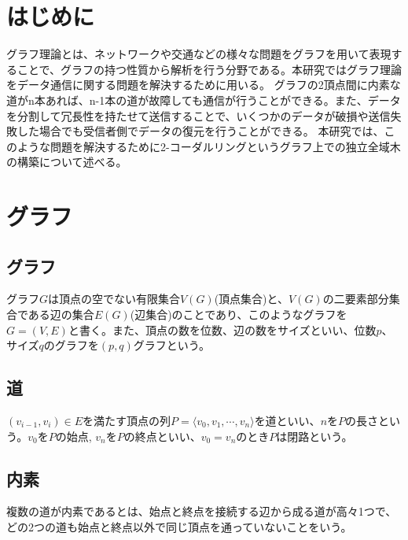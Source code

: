 \documentclass[twocolumn, 11pt]{jsarticle}
\begin{document}
 


\section{はじめに}
    グラフ理論とは、ネットワークや交通などの様々な問題をグラフを用いて表現することで、グラフの持つ性質から解析を行う分野である。本研究ではグラフ理論をデータ通信に関する問題を解決するために用いる。
    グラフの2頂点間に内素な道がn本あれば、n-1本の道が故障しても通信が行うことができる。また、データを分割して冗長性を持たせて送信することで、いくつかのデータが破損や送信失敗した場合でも受信者側でデータの復元を行うことができる。
    本研究では、このような問題を解決するために2-コーダルリングというグラフ上での独立全域木の構築について述べる。

\section{グラフ}
    \subsection{グラフ}
        グラフ$G$は頂点の空でない有限集合$V(G)$(頂点集合)と、$V(G)$の二要素部分集合である辺の集合$E(G)$(辺集合)のことであり、このようなグラフを$G=(V,E)$と書く。また、頂点の数を位数、辺の数をサイズといい、位数$p$、サイズ$q$のグラフを$(p,q)$グラフという。\cite{2006離散数学入門}

    \subsection{道}
        $(v_{i-1}, v_i) \in E$を満たす頂点の列$P = \langle v_0, v_1, \cdots, v_n \rangle$を道といい、$n$を$P$の長さという。$v_0$を$P$の始点, $v_n$を$P$の終点といい、$v_0 = v_n$のとき$P$は閉路という。\cite{2006離散数学入門}

    \subsection{内素}
        複数の道が内素であるとは、始点と終点を接続する辺から成る道が高々1つで、どの2つの道も始点と終点以外で同じ頂点を通っていないことをいう。\cite{chartrand1993applied}
    
\end{document}

